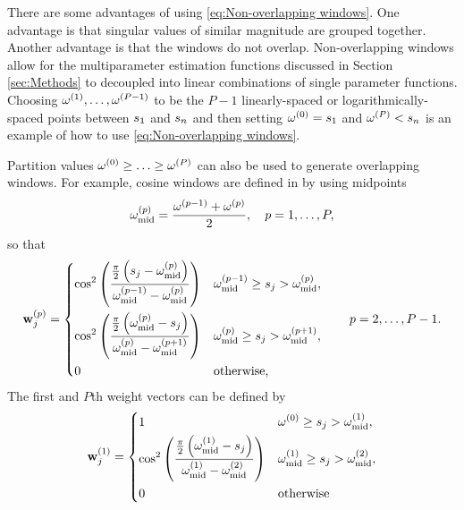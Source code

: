 \documentclass[12pt]{article}
\begin{document}
There are some advantages of using \eqref{eq:Non-overlapping windows}. One advantage is that singular values of similar magnitude are grouped together. Another advantage is that the windows do not overlap. Non-overlapping windows allow for the multiparameter estimation functions discussed in Section \ref{sec:Methods} to decoupled into linear combinations of single parameter functions. Choosing $\omega^{(1)},\ldots,\omega^{(P-1)}$ to be the $P-1$ linearly-spaced or logarithmically-spaced points between $s_1$ and $s_n$ and then setting $\omega^{(0)} = s_1$ and $\omega^{(P)} < s_n$ is an example of how to use \eqref{eq:Non-overlapping windows}. \par 
Partition values $\omega^{(0)} \geq \ldots \geq \omega^{(P)}$ can also be used to generate overlapping windows. For example, cosine windows are defined in \cite{ChungEasleyOLeary} by using midpoints
\begin{equation}
\label{eq:Midpoints}
    \omega_{\text{mid}}^{(p)} = \frac{\omega^{(p-1)} + \omega^{(p)}}{2}, \quad p = 1,\ldots,P,
\end{equation}
so that
\begin{equation}
\label{eq:Middle cosine windows}
    \mathbf{w}_j^{(p)} = \begin{dcases}
    \cos^2\left(\frac{\frac{\pi}{2}\left(s_j - \omega_{\text{mid}}^{(p)}\right)}{\omega_{\text{mid}}^{(p-1)} - \omega_{\text{mid}}^{(p)}}\right) & \omega_{\text{mid}}^{(p-1)} \geq s_j > \omega_{\text{mid}}^{(p)}, \\
    \cos^2\left(\frac{\frac{\pi}{2}\left(\omega_{\text{mid}}^{(p)} - s_j\right)}{\omega_{\text{mid}}^{(p)} - \omega_{\text{mid}}^{(p+1)}}\right) & \omega_{\text{mid}}^{(p)} \geq s_j > \omega_{\text{mid}}^{(p+1)}, \\
    0 & \text{otherwise,}
    \end{dcases} \qquad p = 2,\ldots,P-1.
\end{equation}
The first and $P$th weight vectors can be defined by 
\begin{equation}
\label{eq:First cosine window}
     \mathbf{w}_j^{(1)} = \begin{dcases}
    1 & \omega^{(0)} \geq s_j > \omega_{\text{mid}}^{(1)}, \\
    \cos^2\left(\frac{\frac{\pi}{2}\left(\omega_{\text{mid}}^{(1)} - s_j\right)}{\omega_{\text{mid}}^{(1)} - \omega_{\text{mid}}^{(2)}}\right) & \omega_{\text{mid}}^{(1)} \geq s_j > \omega_{\text{mid}}^{(2)}, \\
    0 & \text{otherwise}
    \end{dcases}
\end{equation}
\end{document}
